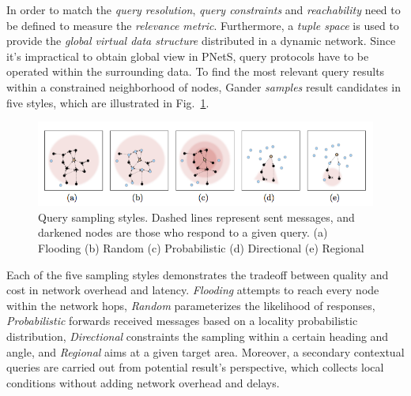 \documentclass[11pt,onecolumn]{article}
\begin{document}
In order to match the {\em query resolution}, {\em query constraints} and {\em reachability} need to be defined to measure the {\em relevance metric}. Furthermore, a {\em tuple space} is used to provide the {\em global virtual data structure} \cite{picco2002global} distributed in a dynamic network. Since it's impractical to obtain global view in PNetS, query protocols have to be operated within the surrounding data. To find the most relevant query results within a constrained neighborhood of nodes, Gander {\em samples} result candidates in five styles, which are illustrated in Fig.~\ref{gander_sampling}.

\begin{figure}[h]
  \begin{center}
    \includegraphics[width=1.0\textwidth]{resources/gander_sampling.png}
  \end{center}
  \vspace{-20pt}
  \caption{Query sampling styles\cite{michel2013gander}. Dashed lines represent sent messages, and darkened nodes are those who respond to a given query. (a) Flooding (b) Random (c) Probabilistic (d) Directional (e) Regional  \label{gander_sampling}}
    \vspace{-15pt}
\end{figure}

Each of the five sampling styles demonstrates the tradeoff between quality and cost in network overhead and latency. {\em Flooding} attempts to reach every node within the network hops, {\em Random} parameterizes the likelihood of responses, {\em Probabilistic} forwards received messages based on a locality probabilistic distribution, {\em Directional} constraints the sampling within a certain heading and angle, and {\em Regional} aims at a given target area. Moreover, a secondary contextual queries are carried out from potential result's perspective, which collects local conditions without adding network overhead and delays.
\end{document}
